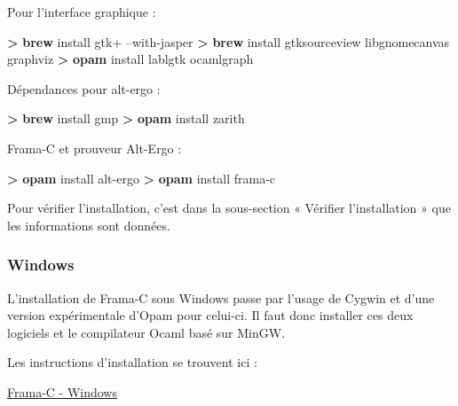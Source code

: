 \documentclass[12pt,francais,]{scrbook}
\newenvironment{Shaded}{}{}
\newcommand{\KeywordTok}[1]{\textcolor[rgb]{0.00,0.44,0.13}{\textbf{{#1}}}}
\newcommand{\NormalTok}[1]{{#1}}
\begin{document}
Pour l'interface graphique :

\begin{footnotesize}\begin{Shaded}
\begin{Highlighting}[]
\KeywordTok{>} \KeywordTok{brew} \NormalTok{install gtk+ --with-jasper}
\KeywordTok{>} \KeywordTok{brew} \NormalTok{install gtksourceview libgnomecanvas graphviz}
\KeywordTok{>} \KeywordTok{opam} \NormalTok{install lablgtk ocamlgraph }
\end{Highlighting}
\end{Shaded}\end{footnotesize}

Dépendances pour alt-ergo :

\begin{footnotesize}\begin{Shaded}
\begin{Highlighting}[]
\KeywordTok{>} \KeywordTok{brew} \NormalTok{install gmp}
\KeywordTok{>} \KeywordTok{opam} \NormalTok{install zarith}
\end{Highlighting}
\end{Shaded}\end{footnotesize}

Frama-C et prouveur Alt-Ergo :

\begin{footnotesize}\begin{Shaded}
\begin{Highlighting}[]
\KeywordTok{>} \KeywordTok{opam} \NormalTok{install alt-ergo}
\KeywordTok{>} \KeywordTok{opam} \NormalTok{install frama-c}
\end{Highlighting}
\end{Shaded}\end{footnotesize}

Pour vérifier l'installation, c'est dans la sous-section « Vérifier
l'installation » que les informations sont données.

\subsubsection{Windows}\label{windows}

L'installation de Frama-C sous Windows passe par l'usage de Cygwin et
d'une version expérimentale d'Opam pour celui-ci. Il faut donc installer
ces deux logiciels et le compilateur Ocaml basé sur MinGW.

Les instructions d'installation se trouvent ici :

\href{https://bts.frama-c.com/dokuwiki/doku.php?id=mantis:frama-c:compiling_from_source}{Frama-C
- Windows}
\end{document}
